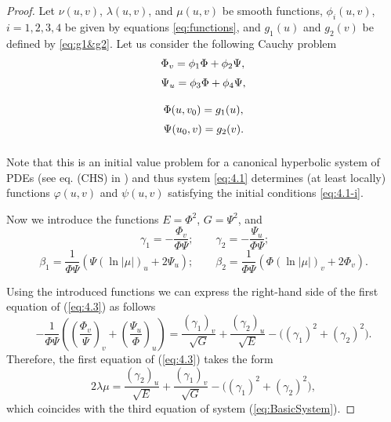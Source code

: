 \documentclass[12pt]{amsart}
\theoremstyle{definition}
\theoremstyle{remark}
\newcommand{\ds}{\displaystyle}
\numberwithin{equation}{section}
\begin{document}
\begin{proof}
	Let $\nu(u,v)$, $\lambda(u,v)$, and  $\mu(u,v)$ be smooth functions, $\phi_i(u,v)$, $i=1,2,3,4$ be given by equations \eqref{eq:functions}, and $g_1(u)$ and $g_2(v)$ be defined by \eqref{eq:g1&g2}.  Let us consider  the following Cauchy problem
	\begin{equation} \label{eq:4.1}
		\begin{array}{l}
			\vspace{2mm}
			\ds\Phi_v=\phi_1\Phi+\phi_2\Psi,  \\ 
			\vspace{2mm}
			\ds\Psi_u   =\phi_3\Phi+\phi_4\Psi, \\
		\end{array}
	\end{equation} 
	\begin{equation} \label{eq:4.1-i}
		\begin{array}{l}
			\vspace{2mm}
			\Phi(u,v_0)=g_1(u), \\
			\vspace{2mm} 
			\Psi(u_0,v)=g_2(v).
		\end{array}
	\end{equation} 
	
	Note that this is an initial value problem for a canonical hyperbolic system of PDEs (see eq. (CHS) in \cite{Top}) and thus system \eqref{eq:4.1} determines (at least locally) functions  $\varphi(u,v)$ and $\psi(u,v)$ 
	satisfying the initial conditions \eqref{eq:4.1-i}.
	
	
	Now we  introduce the functions $ E=\Phi^2 $, $ G=\Psi^2 $,  and 
	\begin{equation} \label{eq:3.7}
		\ \gamma_1=-\frac{\Phi_v}{\Phi \Psi};  \qquad \gamma_2=-\frac{\Psi_u}{\Phi \Psi};
	\end{equation} 
	\begin{equation} \label{eq:3.7-a}
		\ds \beta_1= \frac{1}{\Phi \Psi} \left(\Psi (\ln |\mu|)_u + 2\Psi_u \right);  \qquad 
		\ds \beta_2= \frac{1}{\Phi \Psi} \left(\Phi (\ln|\mu|)_v + 2\Phi_v \right).
\end{equation} 

Using the introduced functions we can express  the right-hand side of the first equation of (\ref{eq:4.3}) as follows
\begin{equation*}
	\ds-\frac1{\Phi \Psi}
			\left( \left(\frac{\Phi_v}{\Psi}\right)_v+\left(\frac{\Psi_u}{\Phi}\right)_u \right)
	= \frac{ (\gamma_1)_v}{\sqrt G}+\frac{(\gamma_2)_u}{\sqrt E}-\Big((\gamma_1)^2+(\gamma_2)^2\Big).
\end{equation*}
Therefore, the first equation of (\ref{eq:4.3}) takes the form
$$
2\lambda\mu=\frac{(\gamma_2)_u}{\sqrt E}+\frac{ (\gamma_1)_v}{\sqrt G}-\Big((\gamma_1)^2+(\gamma_2)^2\Big) ,
$$
which coincides with the third equation of system (\ref{eq:BasicSystem}).


\end{proof}
\end{document}
